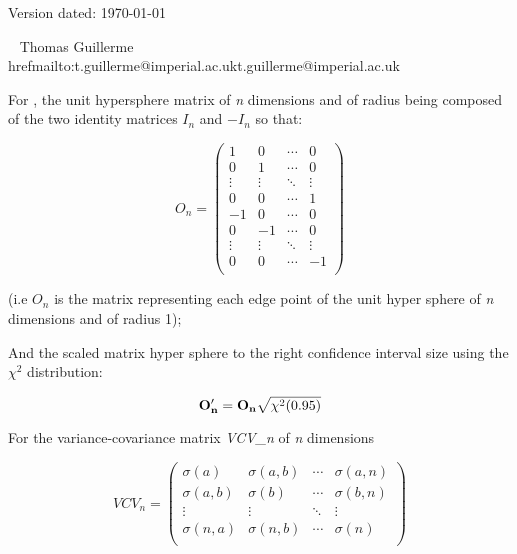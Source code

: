 \documentclass[a4paper,11pt]{article}
\begin{document}
\begin{flushright}
Version dated: \today
\end{flushright}
\begin{center}

\
\bigskip
Thomas Guillerme\\href{mailto:t.guillerme@imperial.ac.uk}{t.guillerme@imperial.ac.uk}

For , the unit hypersphere matrix of \textit{n} dimensions and of radius being composed of the two identity matrices $I_{n}$ and $-I_{n}$ so that: 

\begin{equation*}
O_{n} = 
    \begin{pmatrix}
        1 & 0 & \cdots & 0 \\
        0 & 1 & \cdots & 0 \\
        \vdots  & \vdots  & \ddots & \vdots  \\
        0 & 0 & \cdots & 1 \\
        -1 & 0 & \cdots & 0 \\
        0 & -1 & \cdots & 0 \\
        \vdots  & \vdots  & \ddots & \vdots  \\
        0 & 0 & \cdots & -1 \\
    \end{pmatrix}
\end{equation*}

(i.e $O_{n}$ is the matrix representing each edge point of the unit hyper sphere of \textit{n} dimensions and of radius 1);

And  the scaled matrix hyper sphere to the right confidence interval size using the $\chi^2$ distribution:

\begin{equation}
    \bold{O'_{n}} = \bold{O_{n}} \sqrt{\chi^2(0.95)}
\end{equation}

For the variance-covariance matrix \textit{VCV_{n}} of \textit{n} dimensions

\begin{equation*}
VCV_{n} = 
    \begin{pmatrix}
        \sigma(a) & \sigma(a,b) & \cdots & \sigma(a,n) \\
        \sigma(a,b) & \sigma(b) & \cdots & \sigma(b,n) \\
        \vdots  & \vdots  & \ddots & \vdots  \\
        \sigma(n,a) & \sigma(n,b) & \cdots & \sigma(n) \\
    \end{pmatrix}
\end{equation*}



\end{center}
\end{document}
